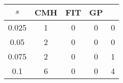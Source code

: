 \centering \begin{tabular}{c|c|c|c|c}
$s$	&CMH	&FIT	&GP	&\sc{Clear}\\\hline
0.025	&1	&0	&0	&0\\
0.05	&2	&0	&0	&0\\
0.075	&2	&0	&0	&1\\
0.1	&6	&0	&0	&4\\
\end{tabular}
